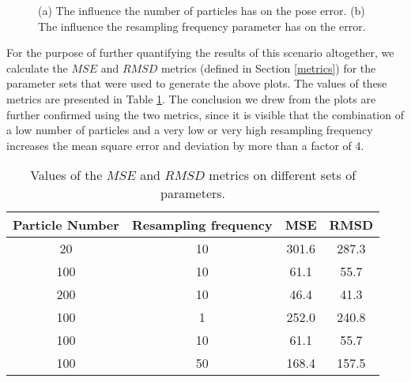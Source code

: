 \begin{figure}[h!]
    \centering
    \begin{subfigure}{0.75\textwidth}
        \centering
        \setlength\figureheight{6cm}
        \setlength\figurewidth{10cm}
        
        \caption{}
        \label{fig:error_vs_particles}
    \end{subfigure}
    \begin{subfigure}{0.75\textwidth}
        \centering
        \setlength\figureheight{6cm}
        \setlength\figurewidth{10cm}
        
        \caption{}
        \label{fig:error_vs_resampling}
    \end{subfigure}
    \caption[Particle filter parameter influence]{
        (a) The influence the number of particles has on the pose error.
        (b) The influence the resampling frequency parameter has on the error.
    }
    \label{fig:parameter_comparison}
\end{figure}

For the purpose of further quantifying the results of this scenario altogether,
we calculate the $MSE$ and $RMSD$ metrics (defined in Section \ref{metrics})
for the parameter sets that were used to generate the above plots.
The values of these metrics are presented in Table \ref{table:metrics}.
The conclusion we drew from the plots are further confirmed using the two
metrics, since it is visible that the combination of a low number of particles
and a very low or very high resampling frequency increases the mean square
error and deviation by more than a factor of 4.

\begin{table}[h!]
    \centering
    \begin{tabular}{| c | c || c | c |}
        \hline
        Particle Number & Resampling frequency & MSE & RMSD \\
        \hline
        \hline
        20 & 10 & 301.6 & 287.3 \\
        \hline
        100 & 10 & 61.1 & 55.7 \\
        \hline
        200 & 10 & 46.4 & 41.3 \\
        \hline
        \hline
        100 & 1 & 252.0 & 240.8 \\
        \hline
        100 & 10 & 61.1 & 55.7 \\
        \hline
        100 & 50 & 168.4 & 157.5 \\
        \hline
    \end{tabular}
    \caption[Metrics on parameter sets for relative localization]{
        Values of the $MSE$ and $RMSD$ metrics on different sets of parameters.
    }
    \label{table:metrics}
\end{table}

